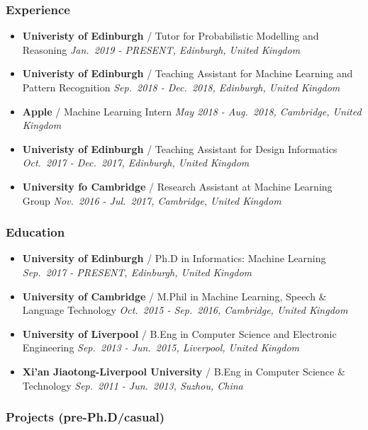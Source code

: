 \documentclass[11pt, a4paper]{article}
\providecommand{\tightlist}{%
  \setlength{\itemsep}{0pt}\setlength{\parskip}{0pt}}
\begin{document}
\begin{raggedright}
\subsubsection{Experience}

\begin{itemize}
\tightlist
\item
  \textbf{Univeristy of Edinburgh} / Tutor for Probabilistic Modelling
  and Reasoning \emph{Jan.~2019 - PRESENT, Edinburgh, United Kingdom}
\item
  \textbf{Univeristy of Edinburgh} / Teaching Assistant for Machine
  Learning and Pattern Recognition \emph{Sep.~2018 - Dec.~2018,
  Edinburgh, United Kingdom}
\item
  \textbf{Apple} / Machine Learning Intern \emph{May 2018 - Aug.~2018,
  Cambridge, United Kingdom}
\item
  \textbf{Univeristy of Edinburgh} / Teaching Assistant for Design
  Informatics \emph{Oct.~2017 - Dec.~2017, Edinburgh, United Kingdom}
\item
  \textbf{University fo Cambridge} / Research Assistant at Machine
  Learning Group \emph{Nov.~2016 - Jul.~2017, Cambridge, United Kingdom}
\end{itemize}

\subsubsection{Education}

\begin{itemize}
\tightlist
\item
  \textbf{University of Edinburgh} / Ph.D in Informatics: Machine
  Learning \emph{Sep.~2017 - PRESENT, Edinburgh, United Kingdom}
\item
  \textbf{University of Cambridge} / M.Phil in Machine Learning, Speech
  \& Language Technology \emph{Oct.~2015 - Sep.~2016, Cambridge, United
  Kingdom}
\item
  \textbf{University of Liverpool} / B.Eng in Computer Science and
  Electronic Engineering \emph{Sep.~2013 - Jun.~2015, Liverpool, United
  Kingdom}
\item
  \textbf{Xi'an Jiaotong-Liverpool University} / B.Eng in Computer
  Science \& Technology \emph{Sep.~2011 - Jun.~2013, Suzhou, China}
\end{itemize}

\subsubsection{Projects (pre-Ph.D/casual)}


\end{raggedright}
\end{document}
